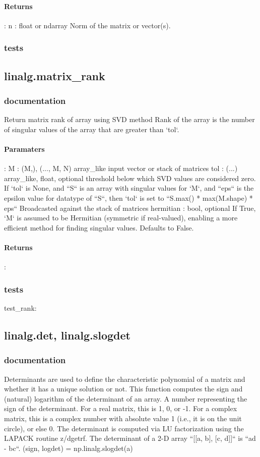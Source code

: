 \documentclass[a4paper,11pt]{article}
\begin{document}
\paragraph{Returns}:    
n : float or ndarray
Norm of the matrix or vector(s).\\

\subsubsection{tests}


\subsection{linalg.matrix\_rank}
\subsubsection{documentation}
Return matrix rank of array using SVD method
Rank of the array is the number of singular values of the array that are
greater than `tol`.
\paragraph{Paramaters}:  M : {(M,), (..., M, N)} array\_like input vector or stack of matrices
tol : (...) array\_like, float, optional
threshold below which SVD values are considered zero. If `tol` is None, and ``S`` is an array with singular values for `M`, and ``eps`` is the epsilon value for datatype of ``S``, then `tol` is set to ``S.max() * max(M.shape) * eps`` Broadcasted against the stack of matrices hermitian : bool, optional If True, `M` is assumed to be Hermitian (symmetric if real-valued),
enabling a more efficient method for finding singular values. Defaults to False.
\paragraph{Returns}: 
\subsubsection{tests}
test\_rank:  


\subsection{linalg.det, linalg.slogdet}
\subsubsection{documentation}
Determinants are used to define the characteristic polynomial of a matrix and whether it has a unique solution or not. This function computes the sign and (natural) logarithm of the determinant of an array. A number representing the sign of the determinant. For a real matrix,
this is 1, 0, or -1. For a complex matrix, this is a complex number with absolute value 1 (i.e., it is on the unit circle), or else 0. The determinant is computed via LU factorization using the LAPACK
routine z/dgetrf. The determinant of a 2-D array ``[[a, b], [c, d]]`` is ``ad - bc``. (sign, logdet) = np.linalg.slogdet(a)
\end{document}

